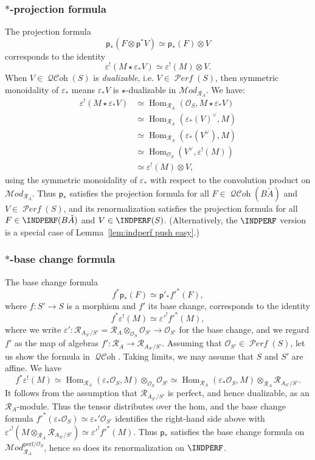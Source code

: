 \documentclass[12pt, oneside]{amsart}
\numberwithin{equation}{section}
\theoremstyle{remark}
\theoremstyle{plain}
\newcommand{\MOD}{\mathcal{M}\textit{od}}
\DeclareMathOperator{\QCOH}{\mathcal{QC}\textit{oh}}
\DeclareMathOperator{\PERF}{\mathcal{P}\textit{erf}}
\DeclareMathOperator{\Hom}{Hom}
\newcommand{\R}{\mathcal{R}}
\newcommand{\RA}{\R_A}
\newcommand{\OO}{\mathcal{O}}
\newcommand{\eps}{\varepsilon}
\newcommand{\sfp}{\mathsf{p}}
\begin{document}
\subsubsection{$*$-projection formula}
The projection formula
$$ \sfp_*(F \otimes \sfp^*V) \simeq \sfp_*(F)\otimes V $$
corresponds to the identity
$$ \eps^!(M \star \eps_*V) \simeq \eps^!(M) \otimes V. $$
When $V \in \QCOH(S)$ is \emph{dualizable}, i.e. $V \in \PERF(S)$, then symmetric monoidality of $\eps_*$ means $\eps_*V$ is $\star$-dualizable in $\MOD_{\RA}$. We have:
\begin{align*}
	\eps^!(M \star \eps_*V)
	&\simeq \Hom_{\RA}(\OO_S, M \star \eps_*V)\\
	&\simeq \Hom_{\RA}(\eps_*(V)^\vee, M)\\
	&\simeq \Hom_{\RA}(\eps_*(V^\vee), M)\\
	&\simeq \Hom_{\OO_S}(V^\vee, \eps^!(M))\\
	&\simeq \eps^!(M) \otimes V,
\end{align*}
using the symmetric monoidality of $\eps_*$ with respect to the convolution product on $\MOD_{\RA}$.
Thus $\sfp_*$ satisfies the projection formula for all $F \in \QCOH(B\check{A})$ and $V \in \PERF(S)$, and its renormalization satisfies the projection formula for all $F \in \INDPERF(B\check{A})$ and $V \in \INDPERF(S)$.
(Alternatively, the $\INDPERF$ version is a special case of Lemma~\ref{lem:indperf push easy}.)

\subsubsection{$*$-base change formula}
The base change formula
$$ f^* \sfp_* (F) \simeq \sfp'_{*} f'^* (F), $$
where $f : S' \to S$ is a morphism and $f'$ its base change, corresponds to the identity
$$ f^* \eps^!(M) \simeq \eps'^! f'^*(M), $$
where we write $\eps' : \R_{A_{S'}/S'} = \RA \otimes_{\OO_S} \OO_{S'} \to \OO_{S'}$ for the base change, and we regard $f'$ as the map of algebras $f' : \RA \to \R_{A_{S'}/S'}$.
Assuming that $\OO_{S'} \in \PERF(S)$, let us show the formula in $\QCOH$.
Taking limits, we may assume that $S$ and $S'$ are affine.
We have
\[
  f^* \eps^!(M)
  \simeq \Hom_{\RA}(\eps_*\OO_S, M) \otimes_{\OO_S} \OO_{S'}
  \simeq \Hom_{\RA}(\eps_*\OO_S, M) \otimes_{\RA} \R_{A_{S'}/S'}.
\]
It follows from the assumption that $\R_{A_{S'}/S'}$ is perfect, and hence dualizable, as an $\RA$-module.
Thus the tensor distributes over the hom, and the base change formula $f'^*(\eps_*\OO_S) \simeq \eps_*'\OO_{S'}$ identifies the right-hand side above with $\eps'^! (M \otimes_{\RA} \R_{A_{S'}/S'}) \simeq \eps'^! f'^*(M)$.
Thus $\sfp_*$ satisfies the base change formula on $\MOD^{\mathrm{perf}/\OO_S}_{\RA}$, hence so does its renormalization on $\INDPERF$.
\end{document}
